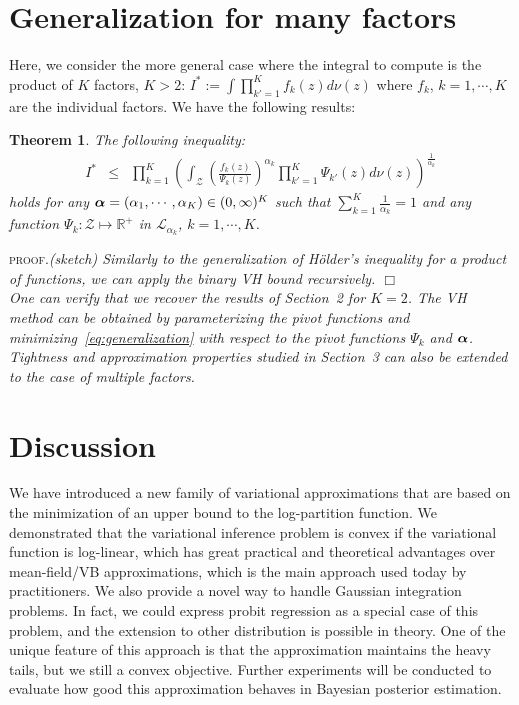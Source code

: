 \documentclass[reqno,oneside,letterpaper,10pt]{article}
\newcommand{\Holder}{H\"older\xspace}
\renewcommand{\t}{\mathbf{t}}
\newcommand{\Zspace}{\mathcal{Z}}
\newcommand{\I}{I}
\newcommand{\basem}{\nu}
\def\z{z}
\renewcommand{\Re}{\mathbb{R}}
\newenvironment{proof}{\textsc{proof.}\it}{\hfill{$\Box$}}
\newtheorem{theorem}{Theorem}
\begin{document}
\section{Generalization for many factors}
\label{many-factor}
Here, we consider the more general case where the integral to compute is the product of $K$ factors, $K>2$:
$\I^*:=\int \prod_{k'=1}^K f_k(\z) d\basem(\z)$ where $f_k$, $k=1,\cdots, K$ are the individual factors.
We have the following results:
\begin{theorem}
The following inequality:
\begin{eqnarray}
\label{eq:generalization}
I^*
&\le& 
\prod_{k=1}^K \left(
	\int_{\Zspace} {\left(\frac{f_k(\z)}{\Psi_k(\z)}\right)}^{\alpha_k} 
	\prod_{k'=1}^K \Psi_{k'}(\z) d\basem(\z)
	\right)^{\frac{1}{\alpha_k}}
\label{eq:Holder2}
\end{eqnarray}
holds for any ${\bm{\alpha}}=(\alpha_1,\cdots,\alpha_K)\in(0,\infty)^K$ such that $\sum_{k=1}^K \frac{1}{\alpha_k}=1$
and any function $\Psi_k:\Zspace\mapsto\Re^+$ in $\mathcal{L}_{\alpha_k}$, $k=1,\cdots, K$.
\end{theorem}
\begin{proof}(sketch)
Similarly to the generalization of \Holder's inequality for a product of functions, we can apply the binary VH bound recursively.
\end{proof}\\
One can verify that we recover the results of Section~2 for $K=2$. 
The VH method can be obtained by parameterizing the pivot functions and minimizing~\eqref{eq:generalization}  with respect
to the pivot functions $\Psi_k$ and ${\bm{\alpha}}$.
Tightness and approximation properties studied in Section~3
can also be extended to the case of multiple factors.


\section{Discussion}
We have introduced a new family of variational approximations that are based on the 
minimization of an upper bound to the log-partition function. We demonstrated that
the variational inference problem is convex if the variational function is log-linear, 
which has great practical and theoretical advantages over mean-field/VB approximations,
which is the main approach used today by practitioners. We also provide a novel way to
handle Gaussian integration problems. In fact, we could express probit regression as a special case of this problem, and the extension to other distribution is possible in theory. One of the unique feature of this approach is that
the approximation maintains the heavy tails, but we still
a convex objective. Further experiments will be conducted to evaluate how good this 
approximation behaves in Bayesian posterior estimation. 
\end{document}
